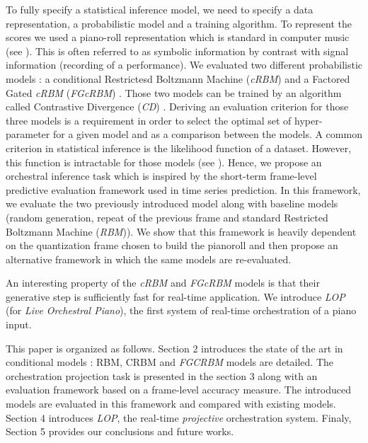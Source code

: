 \documentclass[letterpaper]{article}
\begin{document}
To fully specify a statistical inference model, we need to specify a data representation, a probabilistic model and a training algorithm.
To represent the scores we used a piano-roll representation which is standard in computer music (see ). This is often referred to as symbolic information by contrast with signal information (recording of a performance). We evaluated two different probabilistic models : a conditional Restrictesd Boltzmann Machine (\textit{cRBM}) and a Factored Gated \textit{cRBM} (\textit{FGcRBM}) \cite{taylor2009composable}. Those two models can be trained by an algorithm called Contrastive Divergence (\textit{CD}) \cite{carreira2005contrastive}.
Deriving an evaluation criterion for those three models is a requirement in order to select the optimal set of hyper-parameter for a given model and as a comparison between the models. A common criterion in statistical inference is the likelihood function of a dataset. However, this function is intractable for those models (see ). Hence, we propose an orchestral inference task which is inspired by the short-term frame-level predictive evaluation framework used in time series prediction. 
In this framework, we evaluate the two previously introduced model along with baseline models (random generation, repeat of the previous frame and standard Restricted Boltzmann Machine (\textit{RBM})).
We show that this framework is heavily dependent on the quantization frame chosen to build the pianoroll and then propose an alternative framework in which the same models are re-evaluated.

An interesting property of the \textit{cRBM} and \textit{FGcRBM} models is that their generative step is sufficiently fast for real-time application. We introduce \textit{LOP} (for \textit{Live Orchestral Piano}), the first system of real-time orchestration of a piano input.

This paper is organized as follows. Section 2 introduces the state of the art in conditional models : RBM, CRBM and \textit{FGCRBM} models are detailed. The orchestration projection task is presented in the section 3 along with an evaluation framework based on a frame-level accuracy measure. The introduced models are evaluated in this framework and compared with existing models. Section 4 introduces \textit{LOP}, the real-time \textit{projective} orchestration system. Finaly, Section 5 provides our conclusions and future works.
\end{document}
